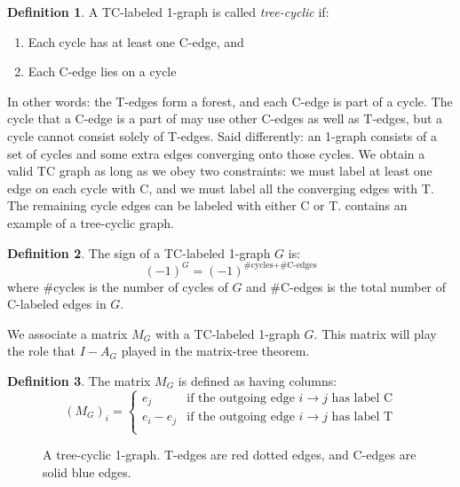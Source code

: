 \documentclass[a4paper, 11pt]{article}
\theoremstyle{definition}
\newtheorem{definition}{Definition}[section]
\begin{document}
\begin{definition}
  A TC-labeled 1-graph is called \emph{tree-cyclic} if:
  \begin{enumerate}
    \item Each cycle has at least one C-edge, and
    \item Each C-edge lies on a cycle
  \end{enumerate}
\end{definition}

In other words: the T-edges form a forest, and each C-edge is part of a cycle. The cycle that a C-edge is a part of may use other C-edges as well as T-edges, but a cycle cannot consist solely of T-edges.
Said differently: an 1-graph consists of a set of cycles and some extra edges converging onto those cycles. We obtain a valid TC graph as long as we obey two constraints: we must label at least one edge on each cycle with C, and we must label all the converging edges with T. The remaining cycle edges can be labeled with either C or T.
 contains an example of a tree-cyclic graph.

\begin{definition}
  The sign of a TC-labeled 1-graph $G$ is:
  \[
   (-1)^{G} = (-1)^{\text{\#cycles} + \text{\#C-edges}}
  \]
  where \#cycles is the number of cycles of $G$ and \#C-edges is the total number of C-labeled edges in $G$.
\end{definition}

We associate a matrix $M_G$ with a TC-labeled 1-graph $G$. This matrix will play the role that $I - A_G$ played in the matrix-tree theorem.

\begin{definition}
  The matrix $M_G$ is defined as having columns:
  \[
    (M_G)_i = \begin{cases}
      e_j & \text{if the outgoing edge $i \to j$ has label C} \\
      e_i - e_j & \text{if the outgoing edge $i \to j$ has label T} \\
    \end{cases}
  \]
\end{definition}

\begin{figure}
  \centering
  \begin{tikzpicture}[spring layout,node distance=30pt, random seed=1]
    
  \end{tikzpicture}
  \caption{A tree-cyclic 1-graph. T-edges are red dotted edges, and C-edges are solid blue edges.}
  \label{fig:tcgraph}
\end{figure}
\end{document}
